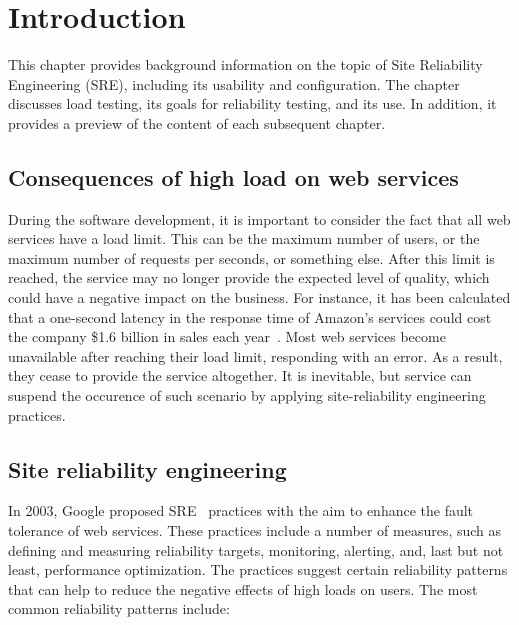 \chapter{Introduction}
\label{ch:intro}

This chapter provides background information on the topic of Site Reliability Engineering (SRE), including its usability and configuration. The chapter discusses load testing, its goals for reliability testing, and its use. In addition, it provides a preview of the content of each subsequent chapter.


\section{Consequences of high load on web services}\label{sec:consequences-of-high-load-on-web-services}
During the software development, it is important to consider the fact that all web services have a load limit. This can be the maximum number of users, or the maximum number of requests per seconds, or something else. After this limit is reached, the service may no longer provide the expected level of quality, which could have a negative impact on the business. For instance, it has been calculated that a one-second latency in the response time of Amazon's services could cost the company \$1.6 billion in sales each year~\cite{one_second_article}.
Most web services become unavailable after reaching their load limit, responding with an error. As a result, they cease to provide the service altogether. It is inevitable, but service can suspend the occurence of such scenario by applying site-reliability engineering practices.


\section{Site reliability engineering}\label{sec:site-reliability-engineering}
In 2003, Google proposed SRE~\cite{google_sre} practices with the aim to enhance the fault tolerance of web services. These practices include a number of measures, such as defining and measuring reliability targets, monitoring, alerting, and, last but not least, performance optimization. The practices suggest certain reliability patterns that can help to reduce the negative effects of high loads on users.
The most common reliability patterns include:

